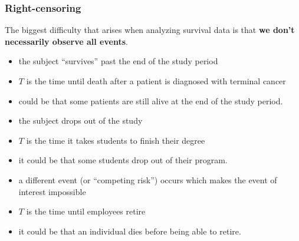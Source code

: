 \documentclass{beamer}
\begin{document}
% 

\begin{frame}
\frametitle{Right-censoring}
The biggest difficulty that arises when analyzing survival data is that \textbf{we don't necessarily observe all events}. 
\begin{itemize}
\vp \vp
\item the subject ``survives'' past the end of the study period
\bi
\item $T$ is the time until death after a patient is diagnosed with terminal cancer 
\bi 
\item could be that some patients are still alive at the end of the study period. \ei
\ei
\item the subject drops out of the study
\bi 
\item $T$ is the time it takes students to finish their degree 
\bi 
\item it could be that some students drop out of their program. \ei
\ei
\item a different event (or ``competing risk'') occurs which makes the event of interest impossible
\bi 
\item $T$ is the time until employees retire \bi \item it could be that an individual dies before being able to retire. 
\ei
\ei
\end{itemize}
\end{frame}
\end{document}
